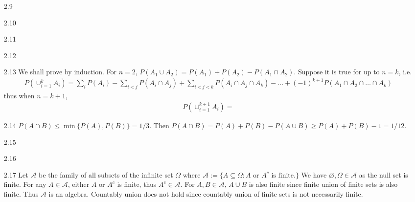 \documentclass[a4paper,10pt]{article}
\theoremstyle{definition}
\begin{document}
\begin{enumerate}
\item[2.9]

\item[2.10]

\item[2.11]

\item[2.12]

\item[2.13] We shall prove by induction. For $n = 2$, $P(A_1 \cup A_2) = P(A_1) + P(A_2) - P(A_1 \cap A_2)$. Suppose it is true for up to $n = k$, i.e.
\begin{align*}
P(\cup^{k}_{i=1}A_i) = \sum_iP(A_i) - \sum_{i<j}P(A_i \cap A_j) + \sum_{i<j<k}P(A_i \cap A_j \cap A_k) -\ldots + (-1)^{k+1}P(A_1\cap A_2 \cap \ldots \cap A_k)
\end{align*}
thus when $n=k+1$,
\begin{align*}
P(\cup^{k+1}_{i=1}A_i) =
\end{align*}

\item[2.14] $P(A \cap B) \leq \min\{P(A),P(B)\} = 1/3$. Then $P(A \cap B) =  P(A) + P(B) - P(A \cup B) \geq  P(A) + P(B) -1 = 1/12$.
\item[2.15]

\item[2.16]

\item[2.17] Let $\mathcal{A}$ be the family of all subsets of the infinite set $\Omega$ where $\mathcal{A}:=\{A \subseteq \Omega: A\text{ or }A^c \text{ is finite.}\}$ We have $\varnothing, \Omega \in \mathcal{A}$ as the null set is finite. For any $A \in \mathcal{A}$, either $A$ or $A^c$ is finite, thus $A^c \in \mathcal{A}$. For $A, B \in \mathcal{A}$, $A \cup B$ is also finite since finite union of finite sets is also finite. Thus $\mathcal{A}$ is an algebra. Countably union does not hold since countably union of finite sets is not necessarily finite.
\end{enumerate}
\end{document}
